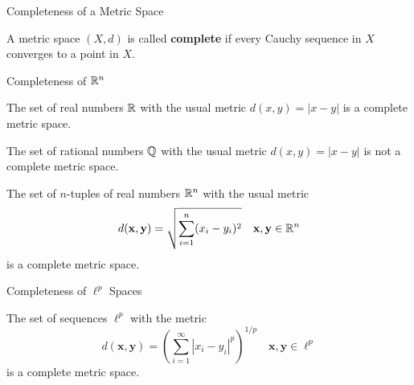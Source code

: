 \documentclass[12pt, a4paper]{article}
\begin{document}
\FrontPage
\Large

\begin{heading}
    Completeness of a Metric Space
\end{heading}

\vspace{10pt}

\begin{definition}
    A metric space $(X, d)$ is called \textbf{complete} if every Cauchy sequence in $X$ converges to a point in $X$.
\end{definition}

\clearpage

\begin{heading}
    Completeness of $\mathbb{R}^n$
\end{heading}

\vspace{10pt}

\begin{theorem}
    The set of real numbers $\mathbb{R}$ with the usual metric $d(x, y) = |x - y|$ is a complete metric space.
\end{theorem}

\clearpage

\begin{theorem}
    The set of rational numbers $\mathbb{Q}$ with the usual metric $d(x, y) = |x - y|$ is not a complete metric space.    
\end{theorem}

\clearpage

\begin{theorem}
    The set of $n$-tuples of real numbers $\mathbb{R}^n$ with the usual metric \[d(\mathbf{x}, \mathbf{y}) = \sqrt{\sum_{i=1}^n (x_i - y_i)^2} \quad \mathbf{x}, \mathbf{y} \in \mathbb{R}^n\] is a complete metric space.
\end{theorem}

\clearpage

\begin{heading}
    Completeness of $\ell^p$ Spaces
\end{heading}

\vspace{10pt}

\begin{theorem}
    The set of sequences $\ell^p$ with the metric \[d(\mathbf{x}, \mathbf{y}) = \left( \sum_{i=1}^\infty |x_i - y_i|^p \right)^{1/p} \quad \mathbf{x}, \mathbf{y} \in \ell^p\] is a complete metric space.
\end{theorem}
\end{document}
